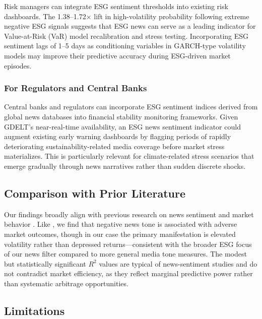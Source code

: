 \documentclass[12pt,a4paper]{article}
\begin{document}
Risk managers can integrate ESG sentiment thresholds into existing risk dashboards. The 1.38--1.72$\times$ lift in high-volatility probability following extreme negative ESG signals suggests that ESG news can serve as a leading indicator for Value-at-Risk (VaR) model recalibration and stress testing. Incorporating ESG sentiment lags of 1--5 days as conditioning variables in GARCH-type volatility models may improve their predictive accuracy during ESG-driven market episodes.

\subsubsection{For Regulators and Central Banks}
\label{subsubsec:impl-regulators}

Central banks and regulators can incorporate ESG sentiment indices derived from global news databases into financial stability monitoring frameworks. Given GDELT's near-real-time availability, an ESG news sentiment indicator could augment existing early warning dashboards by flagging periods of rapidly deteriorating sustainability-related media coverage before market stress materializes. This is particularly relevant for climate-related stress scenarios that emerge gradually through news narratives rather than sudden discrete shocks.

\subsection{Comparison with Prior Literature}
\label{subsec:comparison}

Our findings broadly align with previous research on news sentiment and market behavior \citep{tetlock2007giving, baker2016measuring}. Like \citet{tetlock2007giving}, we find that negative news tone is associated with adverse market outcomes, though in our case the primary manifestation is elevated volatility rather than depressed returns---consistent with the broader ESG focus of our news filter compared to more general media tone measures. The modest but statistically significant $R^2$ values are typical of news-sentiment studies and do not contradict market efficiency, as they reflect marginal predictive power rather than systematic arbitrage opportunities.

\subsection{Limitations}
\label{subsec:limitations}
\end{document}
